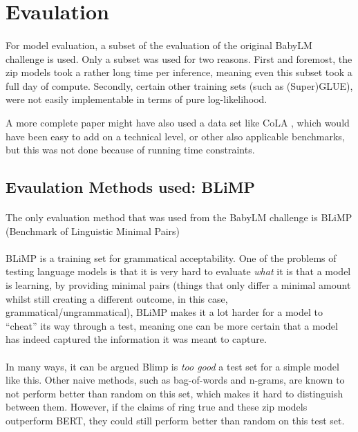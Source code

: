 \documentclass[11pt]{article}
\begin{document}
\section{Evaulation}

\paragraph{}
For model evaluation, a subset of the evaluation of the original BabyLM challenge is used. Only a subset was used for two reasons. First and foremost, the zip models took a rather long time per inference, meaning even this subset took a full day of compute. Secondly, certain other training sets (such as (Super)GLUE), were not easily implementable in terms of pure log-likelihood.

A more complete paper might have also used a data set like CoLA \parencite{warstadt2019cola}, which would have been easy to add on a technical level, or other also applicable benchmarks, but this was not done because of running time constraints.

\subsection{Evaulation Methods used: BLiMP}
\paragraph{}
The only evaluation method that was used from the BabyLM challenge is BLiMP (Benchmark of Linguistic Minimal Pairs) \parencite{warstadt2020blimp}

\paragraph{}
BLiMP is a training set for grammatical acceptability. One of the problems of testing language models is that it is very hard to evaluate \textit{what} it is that a model is learning, by providing minimal pairs (things that only differ a minimal amount whilst still creating a different outcome, in this case, grammatical/ungrammatical), BLiMP makes it a lot harder for a model to ``cheat'' its way through a test, meaning one can be more certain that a model has indeed captured the information it was meant to capture.

\paragraph{}
In many ways, it can be argued Blimp is \textit{too good} a test set for a simple model like this. Other naive methods, such as bag-of-words and n-grams, are known to not perform better than random on this set, which makes it hard to distinguish between them. However, if the claims of \textcite{jiang2023zip} ring true and these zip models outperform BERT, they could still perform better than random on this test set.
\end{document}
